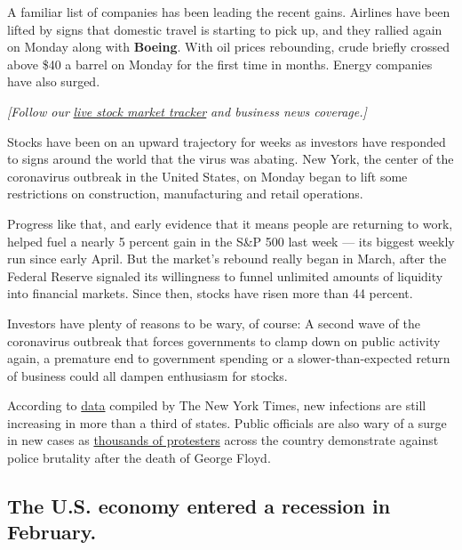 A familiar list of companies has been leading the recent gains. Airlines
have been lifted by signs that domestic travel is starting to pick up,
and they rallied again on Monday along with \textbf{Boeing}. With oil
prices rebounding, crude briefly crossed above \$40 a barrel on Monday
for the first time in months. Energy companies have also surged.

\emph{{[}Follow our}
\href{https://www.nytimes3xbfgragh.onion/2020/06/26/business/stock-market-today-coronavirus.html}{\emph{live
stock market tracker}} \emph{and business news coverage.{]}}

Stocks have been on an upward trajectory for weeks as investors have
responded to signs around the world that the virus was abating. New
York, the center of the coronavirus outbreak in the United States, on
Monday began to lift some restrictions on construction, manufacturing
and retail operations.

Progress like that, and early evidence that it means people are
returning to work, helped fuel a nearly 5 percent gain in the S\&P 500
last week --- its biggest weekly run since early April. But the market's
rebound really began in March, after the Federal Reserve signaled its
willingness to funnel unlimited amounts of liquidity into financial
markets. Since then, stocks have risen more than 44 percent.

Investors have plenty of reasons to be wary, of course: A second wave of
the coronavirus outbreak that forces governments to clamp down on public
activity again, a premature end to government spending or a
slower-than-expected return of business could all dampen enthusiasm for
stocks.

According to
\href{https://www.nytimes3xbfgragh.onion/interactive/2020/us/coronavirus-us-cases.html}{data}
compiled by The New York Times, new infections are still increasing in
more than a third of states. Public officials are also wary of a surge
in new cases as
\href{https://www.nytimes3xbfgragh.onion/2020/06/07/us/Protest-coronavirus-george-floyd.html}{thousands
of protesters} across the country demonstrate against police brutality
after the death of George Floyd.

\hypertarget{the-us-economy-entered-a-recession-in-february}{%
\subsection{The U.S. economy entered a recession in
February.}\label{the-us-economy-entered-a-recession-in-february}}

